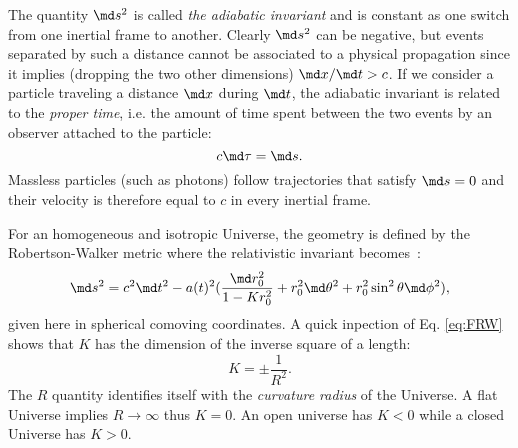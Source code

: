 The quantity $\md s^2$ is called \emph{the adiabatic invariant} and is constant as one switch from one inertial frame to another. Clearly $\md s^2$ can be negative, but events separated by such a distance cannot be associated to a physical propagation since it implies (dropping the two other dimensions) $\md x/\md t >c$. If we consider a particle traveling a distance $\md x$ during $\md t$, the adiabatic invariant is related to the \emph{proper time}, i.e. the amount of time spent between the two events by an observer attached to the particle:
\begin{equation}
c\md \tau=\md s.	
\end{equation}
Massless particles (such as photons) follow trajectories that satisfy $\md s=0$ and their velocity is therefore equal to $c$ in every inertial frame.

For an homogeneous and isotropic Universe, the geometry is defined by the Robertson-Walker metric where the relativistic invariant becomes~:
\begin{equation}
\md s^2=c^2\md t^2-a(t)^2(\frac{\md r_0^2}{1-Kr_0^2}+r_0^2\md\theta^2+r_0^2\sin^2\theta\md\phi^2),
\label{eq:FRW}
\end{equation}
given here in spherical comoving coordinates. 
A quick inpection of Eq. \ref{eq:FRW} shows that $K$ has the dimension of the inverse square of a length:
\begin{equation}
	K=\pm\frac{1}{R^2}.
\end{equation}
The $R$ quantity identifies itself with the \emph{curvature radius} of the Universe. A flat Universe implies $R\rightarrow \infty$ thus $K=0$. An open universe has $K<0$ while a closed Universe has $K>0$.

